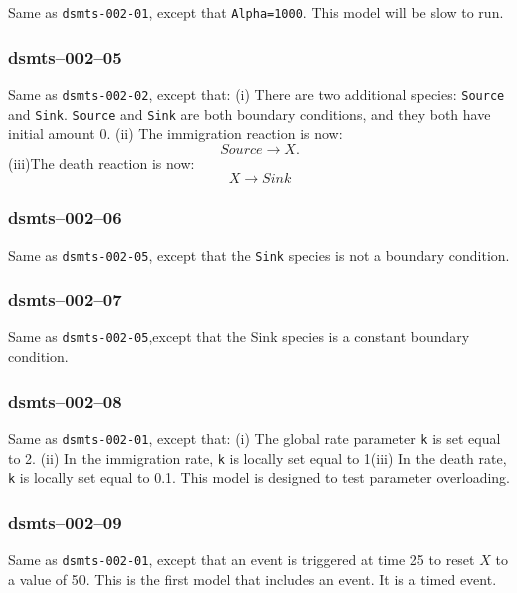 Same as \verb$dsmts-002-01$, except that \verb$Alpha=1000$. This model
will be slow to run.


\subsubsection{dsmts--002--05} 

Same as \verb$dsmts-002-02$, except that: (i) There are two additional
species: \verb$Source$ and \verb$Sink$. \verb$Source$ and \verb$Sink$
are both boundary conditions, and they both have initial amount
0. (ii) The immigration reaction is now: 
\[
Source \longrightarrow X. 
\]
(iii)The death reaction is now:
\[
X \longrightarrow Sink
\]


\subsubsection{dsmts--002--06} 

Same as \verb$dsmts-002-05$, except that the \verb$Sink$ species is
not a boundary condition. 


\subsubsection{dsmts--002--07} 

Same as \verb$dsmts-002-05$,except that the Sink species is a constant
boundary condition. 


\subsubsection{dsmts--002--08}

Same as \verb$dsmts-002-01$, except that: (i) The global rate
parameter \verb$k$ is set equal to 2. (ii) In the immigration rate,
\verb$k$ is locally set equal to 1(iii) In the death rate, \verb$k$ is
locally set equal to 0.1. This model is designed to test parameter
overloading. 


\subsubsection{dsmts--002--09}

Same as \verb$dsmts-002-01$, except that an event is triggered at time
25 to reset $X$ to a value of 50. This is the first model that
includes an event. It is a timed event.

